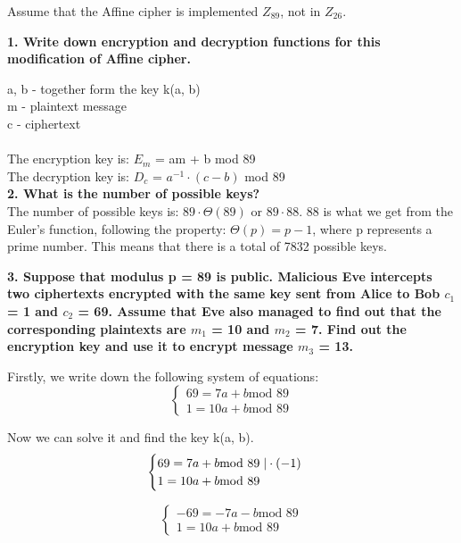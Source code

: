 \documentclass[12pt]{article}
\begin{document}
Assume that the Affine cipher is implemented $Z_{89}$, not in $Z_{26}$.
\newline

\noindent
\textbf{1. Write down encryption and decryption functions for this modification of Affine cipher.}\newline

\noindent a, b - together form the key k(a, b) \\
m - plaintext message \\
c - ciphertext \\\\
\noindent The encryption key is: $E_m$ = am + b mod 89 \\
The decryption key is: $D_c$ = $a^{-1} \cdot (c - b)$ mod 89 \\

\noindent \textbf{2. What is the number of possible keys?}
\newline
\noindent
\\The number of possible keys is: $89 \cdot \Theta(89)$ or $89 \cdot 88$. 88 is 
what we get from the Euler's function, following the property: $\Theta(p) = p - 1$, 
where p represents a prime number. This means that there is a total of 7832 possible
keys.
\newline

\noindent \textbf{3. Suppose that modulus p = 89 is public. Malicious Eve intercepts 
two ciphertexts encrypted with the same key sent from Alice to Bob $c_1$ = 1 and
$c_2$ = 69. Assume that Eve also managed to find out that the corresponding 
plaintexts are $m_1$ = 10 and $m_2$ = 7. Find out the encryption key and use it 
to encrypt message $m_3$ = 13.}
\newline

\noindent Firstly, we write down the following system of equations:
$$\begin{cases}
    69 = 7a + b \text{mod 89} \\
    1 = 10a + b \text{mod 89} 
\end{cases}$$

Now we can solve it and find the key k(a, b). 
$$\begin{cases}
    69 = 7a + b \text{mod 89} \hspace{0.1cm} | \cdot (-1) \\
    1 = 10a + b \text{mod 89} 
\end{cases}$$

$$\begin{cases}
    -69 = -7a - b \text{mod 89} \\
    1 = 10a + b \text{mod 89} 
\end{cases}$$
\end{document}
